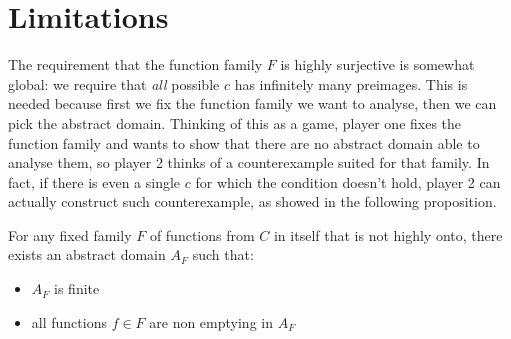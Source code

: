 \section{Limitations}
The requirement that the function family $F$ is highly surjective is somewhat global: we require that \textit{all} possible $c$ has infinitely many preimages.
This is needed because first we fix the function family we want to analyse, then we can pick the abstract domain. Thinking of this as a game, player one fixes the function family and wants to show that there are no abstract domain able to analyse them, so player 2 thinks of a counterexample suited for that family. In fact, if there is even a single $c$ for which the condition doesn't hold, player 2 can actually construct such counterexample, as showed in the following proposition.
\begin{prop}
	For any fixed family $F$ of functions from $C$ in itself that is not highly onto, there exists an abstract domain $A_F$ such that:
	\begin{itemize}
		\item $A_F$ is finite
		\item all functions $f \in F$ are non emptying in $A_F$
	\end{itemize}
\end{prop}
